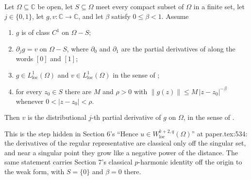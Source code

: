 \begin{lemma}
Let $\Omega\subseteq\mathbb{C}$ be open, let $S\subseteq\Omega$ meet every
compact subset of $\Omega$ in a finite set, let $j\in\{0,1\}$, let
$g,v\colon\mathbb{C}\to\mathbb{C}$, and let $\beta$ satisfy $0\le\beta<1$.
Assume
\begin{enumerate}
\item[(H1)] $g$ is of class $C^1$ on $\Omega-S$;
\item[(H2)] $\partial_jg=v$ on $\Omega-S$, where $\partial_0$ and $\partial_1$
  are the partial derivatives of  along the words $[0]$
  and $[1]$;
\item[(H3)] $g\in L^1_{\mathrm{loc}}(\Omega)$ and $v\in L^1_{\mathrm{loc}}(\Omega)$
  in the sense of ;
\item[(H4)] for every $z_0\in S$ there are $M$ and $\rho>0$ with
  $\|g(z)\|\le M\,|z-z_0|^{-\beta}$ whenever $0<|z-z_0|<\rho$.
\end{enumerate}
Then $v$ is the distributional $j$-th partial derivative of $g$ on $\Omega$, in
the sense of .

This is the step hidden in Section 6's ``Hence
$u\in W^{k+2,q}_{\mathrm{loc}}(\Omega)$'' at paper.tex:534: the derivatives of
the regular representative are classical only off the singular set, and near a
singular point they grow like a negative power of the distance.  The same
statement carries Section 7's classical $p$-harmonic identity off the origin to
the weak form, with $S=\{0\}$ and $\beta=0$ there.
\end{lemma}
